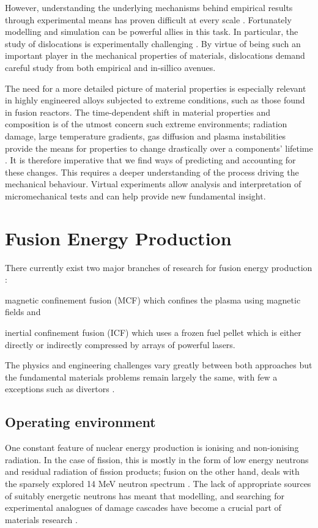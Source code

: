 However, understanding the underlying mechanisms behind empirical results through experimental means has proven difficult at every scale \cite{multiscale_model_mats1, multiscale_model_mats2}. Fortunately modelling and simulation can be powerful allies in this task. In particular, the study of dislocations is experimentally challenging \cite{dln_exp_obs1, dln_exp_obs2, dln_exp_obs3}. By virtue of being such an important player in the mechanical properties of materials, dislocations demand careful study from both empirical and in-sillico avenues.

The need for a more detailed picture of material properties is especially relevant in highly engineered alloys subjected to extreme conditions, such as those found in fusion reactors. The time-dependent shift in material properties and composition is of the utmost concern such extreme environments; radiation damage, large temperature gradients, gas diffusion and plasma instabilities provide the means for properties to change drastically over a components' lifetime \cite{fusmat1, mats_fusion1, mats_fusion2}. It is therefore imperative that we find ways of predicting and accounting for these changes. This requires a deeper understanding of the process driving the mechanical behaviour. Virtual experiments allow analysis and interpretation of micromechanical tests and can help provide new fundamental insight.

\section{Fusion Energy Production}
\label{s:fusion}
There currently exist two major branches of research for fusion energy production \cite{icfvsmcf}:
\begin{inparaenum}
	\item magnetic confinement fusion (MCF) \cite{mcf} which confines the plasma using magnetic fields and
	\item inertial confinement fusion (ICF) \cite{icf} which uses a frozen fuel pellet which is either directly or indirectly compressed by arrays of powerful lasers.
\end{inparaenum}
The physics and engineering challenges vary greatly between both approaches but the fundamental materials problems remain largely the same, with few a exceptions such as divertors \cite{icf_mcf1, icf_mcf2}.

\subsection{Operating environment}
\label{ss:operating_env}
One constant feature of nuclear energy production is ionising and non-ionising radiation. In the case of fission, this is mostly in the form of low energy neutrons and residual radiation of fission products; fusion on the other hand, deals with the sparsely explored 14 MeV neutron spectrum \cite{mats_fis_fus}. The lack of appropriate sources of suitably energetic neutrons \cite{ifmif} has meant that modelling, and searching for experimental analogues of damage cascades have become a crucial part of materials research \cite{fusmat1s}.

